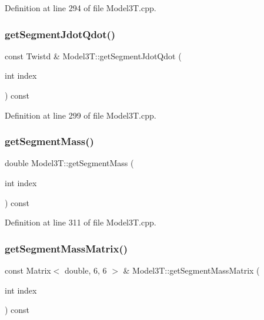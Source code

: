 Definition at line 294 of file Model3\+T.\+cpp.

\hypertarget{classModel3T_add0fcd2f4259009f964a03c6402d1ca9}{}\label{classModel3T_add0fcd2f4259009f964a03c6402d1ca9} 
\subsubsection{\texorpdfstring{get\+Segment\+Jdot\+Qdot()}{getSegmentJdotQdot()}}
{\footnotesize\ttfamily const Twistd \& Model3\+T\+::get\+Segment\+Jdot\+Qdot (\begin{DoxyParamCaption}\item[{int}]{index }\end{DoxyParamCaption}) const\hspace{0.3cm}{\ttfamily [virtual]}}



Definition at line 299 of file Model3\+T.\+cpp.

\hypertarget{classModel3T_a644b29c19a8a08e82f74ff411f5963df}{}\label{classModel3T_a644b29c19a8a08e82f74ff411f5963df} 
\subsubsection{\texorpdfstring{get\+Segment\+Mass()}{getSegmentMass()}}
{\footnotesize\ttfamily double Model3\+T\+::get\+Segment\+Mass (\begin{DoxyParamCaption}\item[{int}]{index }\end{DoxyParamCaption}) const\hspace{0.3cm}{\ttfamily [virtual]}}



Definition at line 311 of file Model3\+T.\+cpp.

\hypertarget{classModel3T_a5bd15fc87b6490e3828953073b52a836}{}\label{classModel3T_a5bd15fc87b6490e3828953073b52a836} 
\subsubsection{\texorpdfstring{get\+Segment\+Mass\+Matrix()}{getSegmentMassMatrix()}}
{\footnotesize\ttfamily const Matrix$<$ double, 6, 6 $>$ \& Model3\+T\+::get\+Segment\+Mass\+Matrix (\begin{DoxyParamCaption}\item[{int}]{index }\end{DoxyParamCaption}) const\hspace{0.3cm}{\ttfamily [virtual]}}



